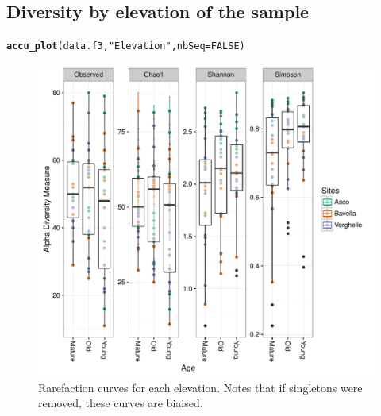 \documentclass[12pt]{article}\usepackage[]{graphicx}\usepackage[]{color}
\makeatletter
\def\maxwidth{ %
  \ifdim\Gin@nat@width>\linewidth
    \linewidth
  \else
    \Gin@nat@width
  \fi
}
\newcommand{\hlnum}[1]{\textcolor[rgb]{0.686,0.059,0.569}{#1}}%
\newcommand{\hlstr}[1]{\textcolor[rgb]{0.192,0.494,0.8}{#1}}%
\newcommand{\hlstd}[1]{\textcolor[rgb]{0.345,0.345,0.345}{#1}}%
\newcommand{\hlkwc}[1]{\textcolor[rgb]{0.333,0.667,0.333}{#1}}%
\newcommand{\hlkwd}[1]{\textcolor[rgb]{0.737,0.353,0.396}{\textbf{#1}}}%
\newenvironment{kframe}{%
 \def\at@end@of@kframe{}%
 \ifinner\ifhmode%
  \def\at@end@of@kframe{\end{minipage}}%
  \begin{minipage}{\columnwidth}%
 \fi\fi%
 \def\FrameCommand##1{\hskip\@totalleftmargin \hskip-\fboxsep
 \colorbox{shadecolor}{##1}\hskip-\fboxsep
     \hskip-\linewidth \hskip-\@totalleftmargin \hskip\columnwidth}%
 \MakeFramed {\advance\hsize-\width
   \@totalleftmargin\z@ \linewidth\hsize
   \@setminipage}}%
 {\par\unskip\endMakeFramed%
 \at@end@of@kframe}
\newenvironment{knitrout}{}{} %
\numberwithin{figure}{section}
\makeatother
\begin{document}
  \subsection{Diversity by elevation of the sample}

\begin{knitrout}\small
{}\color{fgcolor}\begin{kframe}
\begin{alltt}
\hlkwd{accu_plot}\hlstd{(data.f3,} \hlstr{"Elevation"}\hlstd{,} \hlkwc{nbSeq} \hlstd{=} \hlnum{FALSE}\hlstd{)}
\end{alltt}
\end{kframe}\begin{figure}

{\centering \includegraphics[width=\maxwidth]{figure/unnamed-chunk-39-1} 

}

\caption[Rarefaction curves for each elevation]{Rarefaction curves for each elevation. Notes that if singletons were removed, these curves are biaised.}\label{fig:unnamed-chunk-39}
\end{figure}


\end{knitrout}
\end{document}

